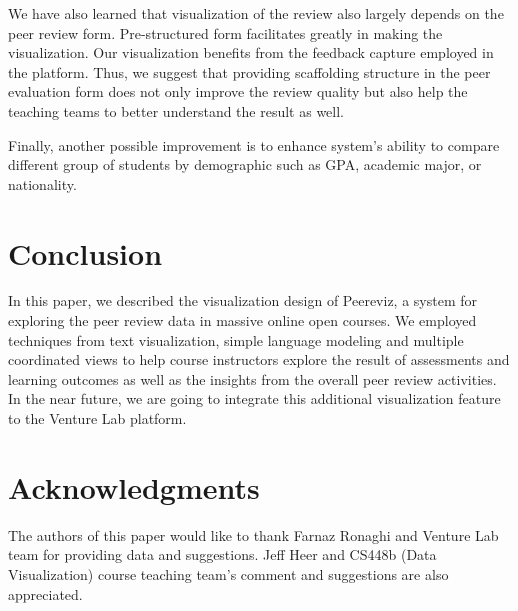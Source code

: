 \documentclass{sigchi}
\begin{document}
We have also learned that visualization of the review also largely depends on
the peer review form.  Pre-structured form facilitates greatly in making the
visualization.  Our visualization benefits from the feedback capture employed in
the platform.  Thus, we suggest that providing scaffolding structure in the peer
evaluation form does not only improve the review quality but also help the
teaching teams to better understand the result as well.

Finally, another possible improvement is to enhance system’s ability to compare
different group of students by demographic such as GPA, academic major, or
nationality.



\section{Conclusion}

In this paper, we described the visualization design of Peereviz, a system for
exploring the peer review data in massive online open courses.   We employed
techniques from text visualization, simple language modeling and multiple
coordinated views to help course instructors explore the result of assessments
and learning outcomes as well as the insights from the overall peer review
activities. In the near future, we are going to integrate this additional
visualization feature to the Venture Lab platform.

\section{Acknowledgments}
The authors of this paper would like to thank Farnaz Ronaghi and Venture Lab
team for providing data and suggestions.
Jeff Heer and CS448b (Data Visualization) course teaching team's comment
and suggestions are also appreciated.

%
%
%
%
%



\end{document}
